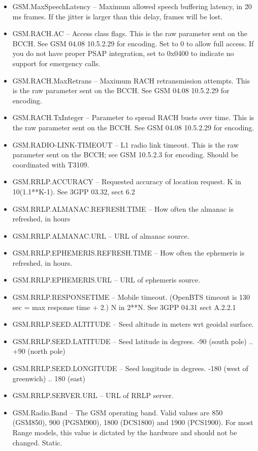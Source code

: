 \documentclass[11pt,openany]{book}
\begin{document}
\begin{itemize}
\item GSM.MaxSpeechLatency -- Maximum allowed speech buffering latency, in 20 ms frames.  If the jitter is larger than this delay, frames will be lost.
\item GSM.RACH.AC -- Access class flags.  This is the raw parameter sent on the BCCH.  See GSM 04.08 10.5.2.29 for encoding.  Set to 0 to allow full access.  If you do not have proper PSAP integration, set to 0x0400 to indicate no support for emergency calls.
\item GSM.RACH.MaxRetrans -- Maximum RACH retransmission attempts.  This is the raw parameter sent on the BCCH.  See GSM 04.08 10.5.2.29 for encoding.
\item GSM.RACH.TxInteger -- Parameter to spread RACH busts over time.  This is the raw parameter sent on the BCCH.  See GSM 04.08 10.5.2.29 for encoding.
\item GSM.RADIO-LINK-TIMEOUT --  L1 radio link timeout.  This is the raw parameter sent on the BCCH; see GSM 10.5.2.3 for encoding. Should be coordinated with T3109.
\item GSM.RRLP.ACCURACY -- Requested accuracy of location request. K in 10(1.1**K-1). See 3GPP 03.32, sect 6.2
\item GSM.RRLP.ALMANAC.REFRESH.TIME -- How often the almanac is refreshed, in hours
\item GSM.RRLP.ALMANAC.URL -- URL of almanac source.
\item GSM.RRLP.EPHEMERIS.REFRESH.TIME -- How often the ephemeris is refreshed, in hours.
\item GSM.RRLP.EPHEMERIS.URL -- URL of ephemeris source.
\item GSM.RRLP.RESPONSETIME -- Mobile timeout. (OpenBTS timeout is 130 sec = max response time + 2.) N in 2**N. See 3GPP 04.31 sect A.2.2.1
\item GSM.RRLP.SEED.ALTITUDE -- Seed altitude in meters wrt geoidal surface.
\item GSM.RRLP.SEED.LATITUDE -- Seed latitude in degrees.  -90 (south pole) .. +90 (north pole)
\item GSM.RRLP.SEED.LONGITUDE -- Seed longitude in degrees.  -180 (west of greenwich) .. 180 (east)
\item GSM.RRLP.SERVER.URL -- URL of RRLP server.
\item GSM.Radio.Band -- The GSM operating band.  Valid values are 850 (GSM850), 900 (PGSM900), 1800 (DCS1800) and 1900 (PCS1900).  For most Range models, this value is dictated by the hardware and should not be changed.  Static.

\end{itemize}
\end{document}
